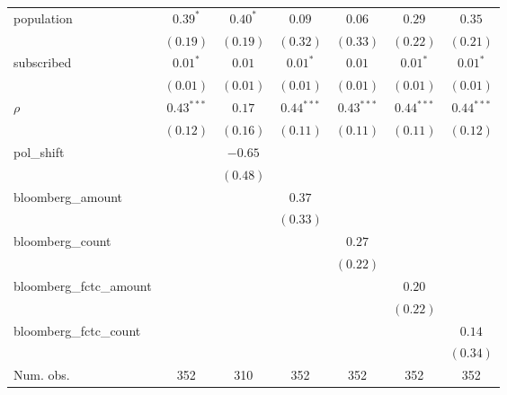 \begin{table}[!h]
\begin{center}
\begin{tabular}{l c c c c c c }
population              & $0.39^{*}$   & $0.40^{*}$   & $0.09$       & $0.06$       & $0.29$       & $0.35$       \\
                        & $(0.19)$     & $(0.19)$     & $(0.32)$     & $(0.33)$     & $(0.22)$     & $(0.21)$     \\
subscribed              & $0.01^{*}$   & $0.01$       & $0.01^{*}$   & $0.01$       & $0.01^{*}$   & $0.01^{*}$   \\
                        & $(0.01)$     & $(0.01)$     & $(0.01)$     & $(0.01)$     & $(0.01)$     & $(0.01)$     \\
$\rho$                  & $0.43^{***}$ & $0.17$       & $0.44^{***}$ & $0.43^{***}$ & $0.44^{***}$ & $0.44^{***}$ \\
                        & $(0.12)$     & $(0.16)$     & $(0.11)$     & $(0.11)$     & $(0.11)$     & $(0.12)$     \\
pol\_shift              &              & $-0.65$      &              &              &              &              \\
                        &              & $(0.48)$     &              &              &              &              \\
bloomberg\_amount       &              &              & $0.37$       &              &              &              \\
                        &              &              & $(0.33)$     &              &              &              \\
bloomberg\_count        &              &              &              & $0.27$       &              &              \\
                        &              &              &              & $(0.22)$     &              &              \\
bloomberg\_fctc\_amount &              &              &              &              & $0.20$       &              \\
                        &              &              &              &              & $(0.22)$     &              \\
bloomberg\_fctc\_count  &              &              &              &              &              & $0.14$       \\
                        &              &              &              &              &              & $(0.34)$     \\
\midrule
Num. obs.               & 352          & 310          & 352          & 352          & 352          & 352          \\

\end{tabular}
\end{center}
\end{table}
